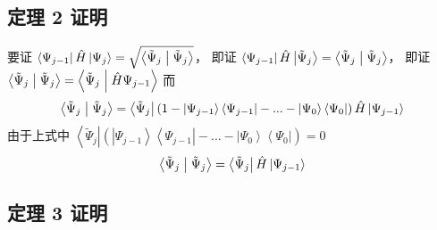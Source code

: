 \subsection{定理 2 证明}
要证 $\left\langle {\Psi_{j - 1}} \right|\hat H\left| {\Psi_j} \right\rangle  = \sqrt {\left\langle {{\tilde \Psi }_j}
 \mathrel{\left | {\vphantom {{{\tilde \Psi }_j} {{\tilde \Psi }_j}}}
 \right. \kern-\nulldelimiterspace}
 {{\tilde \Psi }_j} \right\rangle }$， 即证 $\left\langle {\Psi_{j - 1}} \right|\hat H\left| {{\tilde \Psi }_j} \right\rangle  = \left\langle {{\tilde \Psi }_j}
 \mathrel{\left | {\vphantom {{{\tilde \Psi }_j} {{\tilde \Psi }_j}}}
 \right. \kern-\nulldelimiterspace}
 {{\tilde \Psi }_j} \right\rangle$， 即证 $\left\langle {{\tilde \Psi }_j}
 \mathrel{\left | {\vphantom {{{\tilde \Psi }_j} {{\tilde \Psi }_j}}}
 \right. \kern-\nulldelimiterspace}
 {{\tilde \Psi }_j} \right\rangle  = \left\langle {{\tilde \Psi }_j}
 \mathrel{\left | {\vphantom {{{\tilde \Psi }_j} {\hat H{\Psi_{j - 1}}}}}
 \right. \kern-\nulldelimiterspace}
 {\hat H{\Psi_{j - 1}}} \right\rangle $
而
\begin{equation}
\left\langle {{\tilde \Psi }_j}
 \mathrel{\left | {\vphantom {{{\tilde \Psi }_j} {{\tilde \Psi }_j}}}
 \right. \kern-\nulldelimiterspace}
 {{\tilde \Psi }_j} \right\rangle  = \left\langle {{\tilde \Psi }_j} \right|\left( {1 - \left| {\Psi_{j - 1}} \right\rangle \left\langle {\Psi_{j - 1}} \right| - ... - \left| {\Psi_0} \right\rangle \left\langle {\Psi_0} \right|} \right)\hat H\left| {\Psi_{j - 1}} \right\rangle 
\end{equation}
由于上式中  $\left\langle {{\tilde \Psi }_j} \right|\left( {\left| {\Psi_{j - 1}} \right\rangle \left\langle {\Psi_{j - 1}} \right| - ... - \left| {\Psi_0} \right\rangle \left\langle {\Psi_0} \right|} \right) = 0$
\begin{equation}
 \left\langle {{\tilde \Psi }_j}
 \mathrel{\left | {\vphantom {{{\tilde \Psi }_j} {{\tilde \Psi }_j}}}
 \right. \kern-\nulldelimiterspace}
 {{\tilde \Psi }_j} \right\rangle  = \left\langle {{\tilde \Psi }_j} \right|\hat H\left| {\Psi_{j - 1}} \right\rangle
\end{equation}

\subsection{定理 3 证明}

